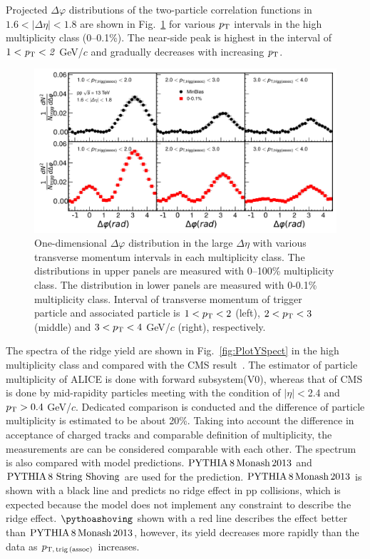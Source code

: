 Projected $\Delta\varphi$ distributions of the two-particle correlation functions in $1.6<|\Delta\eta|<1.8$ are shown in Fig.~\ref{fig:PlotDeltaPhi} for various $\it{p}_{\rm{T}}$ intervals in the high multiplicity class (0--0.1\%). The near-side peak is highest in the interval of $1<\it{p}_{\rm{T}}<2$ GeV/$c$ and gradually decreases with increasing $\it{p}_{\rm{T}}$.


\begin{figure}[h!]
	\centering
	\includegraphics[width=0.99\linewidth]{./figures/Fig2_PlotDeltaPhi.pdf}
	\caption{One-dimensional $\Delta\varphi$ distribution in the large $\Delta\eta$ with various transverse momentum intervals in each multiplicity class. The distributions in upper panels are measured with 0--100\% multiplicity class. The distribution in lower panels are measured with 0-0.1\% multiplicity class. Interval of transverse momentum of trigger particle and associated particle is $1<p_\mathrm{T}<2$ (left), $2<p_\mathrm{T}<3$ (middle) and $3<p_\mathrm{T}<4$ GeV/$c$ (right), respectively. }
	\label{fig:PlotDeltaPhi}
\end{figure}
 
The spectra of the ridge yield are shown in Fig.~\ref{fig:PlotYSpect} in the high multiplicity class and compared with the CMS result~\cite{}. The estimator of particle multiplicity of ALICE is done with forward subsystem(V0), whereas that of CMS is done by mid-rapidity particles meeting with the condition of $|\eta|<$2.4 and $p_\mathrm{T}>0.4$ GeV/$c$. Dedicated comparison is conducted and the difference of particle multiplicity is estimated to be about 20\%. Taking into account the difference in acceptance of charged tracks and comparable definition of multiplicity, the measurements are can be considered comparable with each other. The spectrum is also compared with model predictions. $\mathrm{PYTHIA}\,8\,\mathrm{Monash}\,2013$ and $\mathrm{PYTHIA}\,8~\mathrm{String}~\mathrm{Shoving}$ are used for the prediction. $\mathrm{PYTHIA}\,8\,\mathrm{Monash}\,2013$ is shown with a black line and predicts no ridge effect in pp collisions, which is expected because the model does not implement any constraint to describe the ridge effect. $\pythoashoving$ shown with a red line describes the effect better than $\mathrm{PYTHIA}\,8\,\mathrm{Monash}\,2013$, however, its yield decreases more rapidly than the data as $p_\mathrm{T,\,trig\,(assoc)}$ increases.


